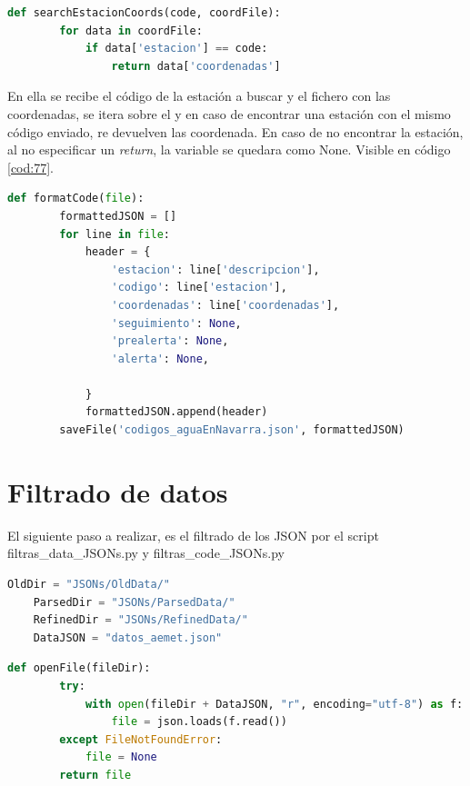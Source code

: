 \begin{lstlisting}[language=Python, caption={Declaración función \textit{searchEstacionCoords()}} usada para formatear los JSON de códigos en CHCantábrico y MeteoNavarra, label=cod:77]
	def searchEstacionCoords(code, coordFile):
		for data in coordFile:
			if data['estacion'] == code:
				return data['coordenadas']
\end{lstlisting}

En ella se recibe el código de la estación a buscar y el fichero con las coordenadas, se itera sobre el y en caso de encontrar una estación con el mismo código enviado, re devuelven las coordenada. En caso de no encontrar la estación, al no especificar un \textit{return}, la variable se quedara como None. Visible en código \ref{cod:77}.

\begin{lstlisting}[language=Python, caption={Declaración función \textit{formatCode()}}, label=cod:78]
	def formatCode(file):
		formattedJSON = []
		for line in file:
			header = {
				'estacion': line['descripcion'],
				'codigo': line['estacion'],
				'coordenadas': line['coordenadas'],
				'seguimiento': None,
				'prealerta': None,
				'alerta': None,
				
			}
			formattedJSON.append(header)
		saveFile('codigos_aguaEnNavarra.json', formattedJSON)
\end{lstlisting}

\section{Filtrado de datos}
El siguiente paso a realizar, es el filtrado de los JSON por el script filtras\_data\_JSONs.py y filtras\_code\_JSONs.py

\begin{lstlisting}[language=Python, caption={Declaración rutas JSONs y nombre de fichero}, label=cod:79]
	OldDir = "JSONs/OldData/"
	ParsedDir = "JSONs/ParsedData/"
	RefinedDir = "JSONs/RefinedData/"
	DataJSON = "datos_aemet.json"
\end{lstlisting}

\begin{lstlisting}[language=Python, caption={Declaración función openFile()}, label=cod:80]
	def openFile(fileDir):
		try:
			with open(fileDir + DataJSON, "r", encoding="utf-8") as f:
				file = json.loads(f.read())
		except FileNotFoundError:
			file = None
		return file
\end{lstlisting}

